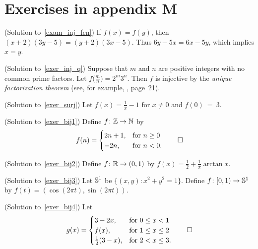 \section{Exercises in appendix M}

\begin{prf}\label{sol_exam_inj_fcn}(Solution to~\ref{exam_inj_fcn})
If $f(x) = f(y)$, then $(x + 2)(3y - 5) = (y + 2)(3x - 5)$. Thus $6y - 5x = 6x - 5y$, which
implies $x = y$.
\end{prf}

\begin{prf}\label{sol_exer_inj_q}(Solution to~\ref{exer_inj_q})
Suppose that $m$ and $n$ are positive integers with no common prime factors. Let $f\bigl(\frac
mn\bigr) = 2^m3^n$. Then  $f$ is injective by the \emph{unique factorization theorem} (see,
for example, \cite{BirkhoffMacL:1953}, page~21).
\end{prf}

\begin{prf}\label{sol_exer_surj}(Solution to~\ref{exer_surj})
Let $f(x) = \frac1x - 1$ for $x \ne 0$ and $f(0)~=~3$.
\end{prf}

\begin{prf}\label{sol_exer_bij1}(Solution to~\ref{exer_bij1})
Define $f\colon \mathbb{Z} \rightarrow \mathbb{N}$ by
    \[f(n) = \begin{cases} 2n + 1, &\text{for $n \ge 0$} \\
                             -2n,  &\text{for $n < 0$}.
             \end{cases}   \qedhere \]
\end{prf}

\begin{prf}\label{sol_exer_bij2}(Solution to~\ref{exer_bij2})
Define $f\colon \mathbb{R} \rightarrow (0,1)$ by $f(x) = \frac12 + \frac1\pi \arctan x$.
\end{prf}

\begin{prf}\label{sol_exer_bij3}(Solution to~\ref{exer_bij3})
Let $\mathbb{S}^1$ be $\{(x,y)\colon  x^2 + y^2 = 1\}$.  Define $f\colon [0,1) \rightarrow \mathbb{S}^1$ by $f(t) =
(\cos(2\pi t), \sin (2\pi t))$.
\end{prf}

\begin{prf}\label{sol_exer_bij4}(Solution to~\ref{exer_bij4})
Let
   \[g(x) = \begin{cases}   3 - 2x,   &\text{for $0 \le x < 1$} \\
                          f(x),       &\text{for $1 \le x \le 2$}\\
                        \frac12(3-x), &\text{for $2 < x \le 3$}.
            \end{cases}   \qedhere\]
\end{prf}

